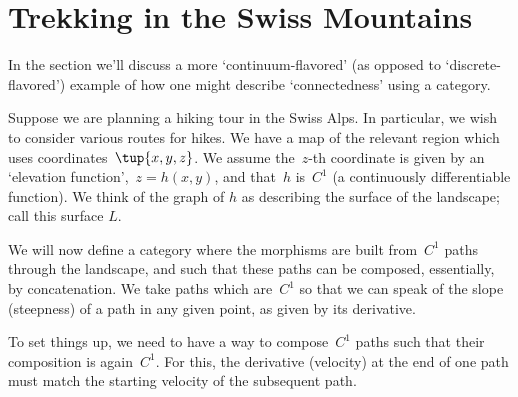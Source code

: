 
\section{Trekking in the Swiss Mountains}
\label{sec:trekking}

In the section we'll discuss a more `continuum-flavored' (as opposed to `discrete-flavored') example of how one might describe `connectedness' using a category.

Suppose we are planning a hiking tour in the Swiss Alps.
In particular, we wish to consider various routes for hikes.
We have a map of the relevant region which uses coordinates~$\tup{x,y,z}$.
We assume the~$z$-th coordinate is given by an `elevation function',~$z = h(x,y)$, and that~$h$ is~$C^1$ (a continuously differentiable function).
We think of the graph of $h$ as describing the surface of the landscape; call this surface $L$.

We will now define a category where the morphisms are built from~$C^1$ paths through the landscape, and such that these paths can be composed, essentially, by concatenation.
We take paths which are~$C^1$ so that we can speak of the slope (steepness) of a path in any given point, as given by its derivative.

To set things up, we need to have a way to compose~$C^1$ paths such that their composition is again~$C^1$.
For this, the derivative (velocity) at the end of one path must match the starting velocity of the subsequent path.

